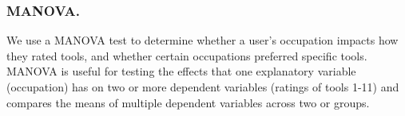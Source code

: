 \subsubsection{MANOVA.}
We use a MANOVA test to determine whether a user's occupation impacts how they rated tools, and whether certain occupations preferred specific tools. MANOVA is useful for testing the effects that one explanatory variable (occupation) has on two or more dependent variables (ratings of tools 1-11) and compares the means of multiple dependent variables across two or groups. 
